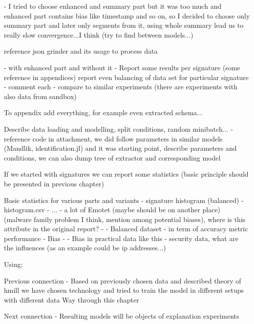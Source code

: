 {- I tried to choose enhanced and summary part but it was too much and enhanced part contains bias like timestamp and so on, so I decided to choose only summary part and later only segments from it, using whole summary lead us to really slow convergence...I think (try to find between models...)

reference json grinder and its usage to process data

- with enhanced part and without it
  - Report some results per signature (some reference in appendices) report even balancing of data set for particular signature
  - comment each
  - compare to similar experiments (there are experiments with also data from sandbox)



To appendix add everything, for example even extracted schema...

Describe data loading and modelling, split conditions, random minibatch... - reference code in attachment, we did follow parameters in similar models (Mandlik, identification.jl) and it was starting point, describe parameters and conditions, we can also dump tree of extractor and corresponding model


If we started with signatures we can report some statistics (basic principle should be presented in previous chapter)

Basic statistics for various parts and variants
  - signature histogram (balanced) - histogram.csv
  - ...
  - a lot of Emotet (maybe should be on another place) (malware family problem I think, mention among potential biases), where is this attribute in the original report?
  - - Balanced dataset - in term of accuracy metric performance
  - Bias - - Bias in practical data like this - security data, what are the influences (as an example could be ip addresses...)

Using:




Previous connection
- Based on previously chosen data and described theory of hmill we have chosen technology and tried to train the model in different setups with different data
Way through this chapter

Next connection
- Resulting models will be objects of explanation experiments



}
